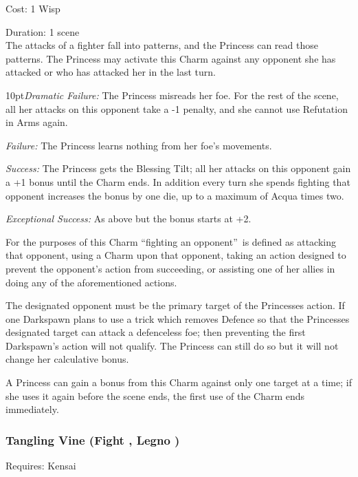 \noindent Cost: 1 Wisp

\noindent Duration: 1 scene\\

The attacks of a fighter fall into patterns, and the Princess can read those patterns. The Princess may activate this Charm against any opponent she has attacked or who has attacked her in the last turn. 

\begin{myindentpar}{10pt}\emph{Dramatic Failure:} The Princess misreads her foe. For the rest of the scene, all her attacks on this opponent take a -1 penalty, and she cannot use Refutation in Arms again.

\emph{Failure:} The Princess learns nothing from her foe's movements.

\emph{Success:} The Princess gets the Blessing Tilt; all her attacks on this opponent gain a +1 bonus until the Charm ends. In addition every turn she spends fighting that opponent increases the bonus by one die, up to a maximum of Acqua times two. 

\emph{Exceptional Success:} As above but the bonus starts at +2.\end{myindentpar}

\noindent For the purposes of this Charm \textquotedblleft fighting an opponent\textquotedblright\, is defined as attacking that opponent, using a Charm upon that opponent, taking an action designed to prevent the opponent's action from succeeding, or assisting one of her allies in doing any of the aforementioned actions.

The designated opponent must be the primary target of the Princesses action. If one Darkspawn plans to use a trick which removes Defence so that the Princesses designated target can attack a defenceless foe; then preventing the first Darkspawn's action will not qualify. The Princess can still do so but it will not change her calculative bonus. 

A Princess can gain a bonus from this Charm against only one target at a time; if she uses it again before the scene ends, the first use of the Charm ends immediately.

\subsubsection*{Tangling Vine (Fight \textbullet\textbullet\textbullet, Legno \textbullet\textbullet)}

\noindent Requires: Kensai

